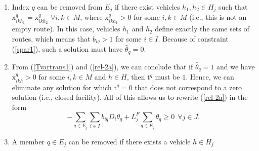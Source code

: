 \begin{enumerate}
  We form equivalence classes from which all but one member may safely be 
  eliminated from $E_j$.
\item 
  Index $q$ can be removed from $E_j$
  if there exist vehicles $h_1, h_2 \in H_j$ such that
  $\mbox{x}_{ikh_1}^q = \mbox{x}_{ikh_2}^q$ $\forall i, k \in M$, where
  $\mbox{x}_{ikh_1}^q>0$ for some $i, k \in M$ (i.e., this is not an
  empty route). In this case, vehicles $h_1$ and $h_2$ define exactly
  the same sets of routes, which means that $b_{iq}> 1$ for some $i \in
  I$. Because of constraint (\ref{spar1}), such a solution must have
  $\hat{\theta}_q=0$.
\item From (\ref{Tvartrans1}) and (\ref{rel-2a}), we can
  conclude that if $\hat{\theta}_q =1$ and we have $\mbox{x}_{ikh}^q>0$
  for some $i, k \in M$ and $h \in H$, then $\mbox{t}^q$ must be $1$.
  Hence, we can eliminate any solution for which $\mbox{t}^q = 0$
  that does not correspond to a zero solution (i.e., closed facility).
  All of this allows us to rewrite (\ref{rel-2a}) in the form
  \begin{equation}
     -\sum_{q \in E_j} \sum_{i \in I} b_{iq} D_i \theta_q  
     + L^F_j \sum_{q \in E_j} \theta_q \geq 0 \ \ \forall j \in J. \label{rel-2-new-a}
  \end{equation}
\item A member $q \in E_j$ %
  can be removed if there exists a vehicle $h \in H_j$

\end{enumerate}
